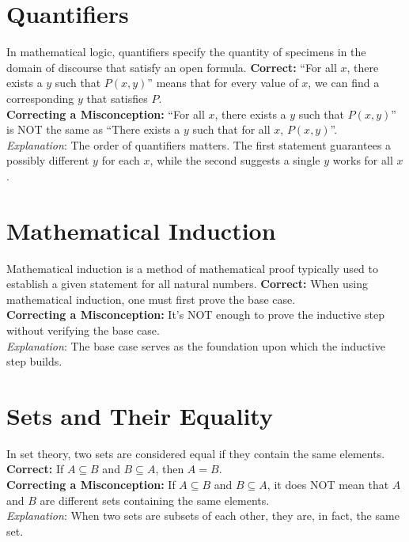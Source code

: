 \documentclass[12pt]{article}
\newenvironment{correct}{\noindent\textbf{Correct:}}{\\}
\newenvironment{misconception}{\noindent\textbf{Correcting a Misconception:}}{\\}
\newenvironment{explanation}{\noindent\textit{Explanation}:}{\\\vspace{1em}}
\begin{document}
\section*{Quantifiers}
In mathematical logic, quantifiers specify the quantity of specimens in the domain of discourse that satisfy an open formula.
\begin{correct} ``For all \(x\), there exists a \(y\) such that \(P(x,y)\)'' means that for every value of \(x\), we can find a corresponding \(y\) that satisfies \(P\). \end{correct}
\begin{misconception} ``For all \(x\), there exists a \(y\) such that \(P(x,y)\)'' is NOT the same as ``There exists a \(y\) such that for all \(x\), \(P(x,y)\)''. \end{misconception}
\begin{explanation} The order of quantifiers matters. The first statement guarantees a possibly different \(y\) for each \(x\), while the second suggests a single \(y\) works for all \(x\). \end{explanation}

\section*{Mathematical Induction}
Mathematical induction is a method of mathematical proof typically used to establish a given statement for all natural numbers.
\begin{correct} When using mathematical induction, one must first prove the base case. \end{correct}
\begin{misconception} It's NOT enough to prove the inductive step without verifying the base case. \end{misconception}
\begin{explanation} The base case serves as the foundation upon which the inductive step builds. \end{explanation}

\section*{Sets and Their Equality}
In set theory, two sets are considered equal if they contain the same elements.
\begin{correct} If \(A \subseteq B\) and \(B \subseteq A\), then \(A = B\). \end{correct}
\begin{misconception} If \(A \subseteq B\) and \(B \subseteq A\), it does NOT mean that \(A\) and \(B\) are different sets containing the same elements. \end{misconception}
\begin{explanation} When two sets are subsets of each other, they are, in fact, the same set. \end{explanation}
\end{document}
